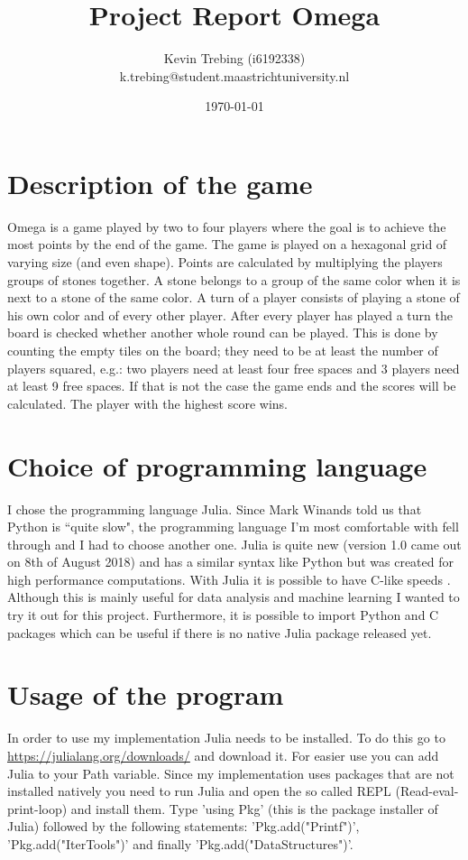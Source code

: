 \documentclass[a4paper]{article}
\title{Project Report Omega}
\author{Kevin Trebing (i6192338) \\ k.trebing@student.maastrichtuniversity.nl}
\date{\today}
\begin{document}
\maketitle

\section{Description of the game}
Omega is a game played by two to four players where the goal is to achieve the most points by the end of the game. The game is played on a hexagonal grid of varying size (and even shape). Points are calculated by multiplying the players groups of stones together. A stone belongs to a group of the same color when it is next to a stone of the same color. A turn of a player consists of playing a stone of his own color and of every other player. After every player has played a turn the board is checked whether another whole round can be played. This is done by counting the empty tiles on the board; they need to be at least the number of players squared, e.g.: two players need at least four free spaces and 3 players need at least 9 free spaces. If that is not the case the game ends and the scores will be calculated. The player with the highest score wins.

\section{Choice of programming language}
I chose the programming language Julia. Since Mark Winands told us that Python is ``quite slow", the programming language I'm most comfortable with fell through and I had to choose another one. Julia is quite new (version 1.0 came out on 8th of August 2018) \cite{julia1} and has a similar syntax like Python but was created for high performance computations. With Julia it is possible to have C-like speeds \cite{benchmarks}. Although this is mainly useful for data analysis and machine learning I wanted to try it out for this project. Furthermore, it is possible to import Python and C packages which can be useful if there is no native Julia package released yet.

\section{Usage of the program}
In order to use my implementation Julia needs to be installed. To do this go to \url{https://julialang.org/downloads/} and download it. For easier use you can add Julia to your Path variable. Since my implementation uses packages that are not installed natively you need to run Julia and open the so called REPL (Read-eval-print-loop) and install them. Type 'using Pkg' (this is the package installer of Julia) followed by the following statements: 'Pkg.add("Printf")', 'Pkg.add("IterTools")' and finally 'Pkg.add("DataStructures")'.
\end{document}
